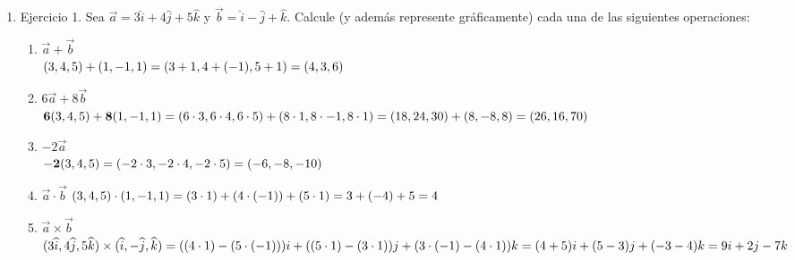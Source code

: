 \documentclass[10pt,letterpaper,fleqn]{article}
\begin{document}
    \begin{enumerate}

        \item Ejercicio 1. Sea $\overrightarrow{a} = 3\widehat{i} + 4\widehat{j}
        + 5\widehat{k}$ y $\overrightarrow{b} = \widehat{i} - \widehat{j} +
        \widehat{k}$. Calcule (y además represente gráficamente) cada una de las
        siguientes operaciones:
        \begin{enumerate}
          \item $\overrightarrow{a} + \overrightarrow{b}$ \\
            $ (3,4,5) + (1,-1,1) \\
              =(3+1,4+(-1),5+1) \\
              =(4,3,6)
            $
            \\
          \item $6 \overrightarrow{a} + 8 \overrightarrow{b}$ \\
            $
              {\bf 6}(3,4,5) + {\bf 8}(1,-1,1) \\
              = (6 \cdot 3, 6 \cdot 4, 6 \cdot 5) + (8 \cdot 1, 8 \cdot -1,
              8 \cdot 1) \\
              = (18,24,30) + (8,-8,8) \\
              = (26,16,70)
            $
            \\
          \item $-2 \overrightarrow{a}$ \\
            $
              {\bf -2}(3,4,5) \\
              = (-2\cdot 3, -2\cdot 4, -2\cdot 5) \\
              = (-6,-8,-10)
            $
            \\
          \item $\overrightarrow{a} \cdot \overrightarrow{b}$
            $
              (3,4,5) \cdot (1,-1,1) \\
              = (3 \cdot 1) + (4 \cdot (-1)) + (5 \cdot 1) \\
              = 3 + (-4) + 5 \\
              = 4
            $
            \\
          \item $\overrightarrow{a} \times \overrightarrow{b}$
            $
            (3\widehat{i}, 4\widehat{j}, 5\widehat{k}) \times
            (\widehat{i}, -\widehat{j},\widehat{k}) \\
            = ((4\cdot 1) - (5\cdot(-1)))i + ((5\cdot 1) - (3\cdot 1))j +
            (3\cdot(-1) - (4\cdot 1))k \\
            = (4+5)i + (5-3)j + (-3-4)k \\
            = 9i + 2j -7k
            $
            \\
        \end{enumerate}


\end{enumerate}
\end{document}
